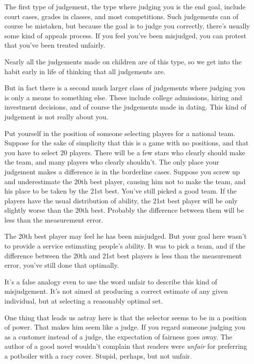 \documentclass[12pt]{book}
\begin{document}
The first type of judgement, the type where judging you is the end goal,
include court cases, grades in classes, and most competitions. Such
judgements can of course be mistaken, but because the goal is to judge
you correctly, there's usually some kind of appeals process. If you feel
you've been misjudged, you can protest that you've been treated
unfairly.

Nearly all the judgements made on children are of this type, so we get
into the habit early in life of thinking that all judgements are.

But in fact there is a second much larger class of judgements where
judging you is only a means to something else. These include college
admissions, hiring and investment decisions, and of course the
judgements made in dating. This kind of judgement is not really about
you.

Put yourself in the position of someone selecting players for a national
team. Suppose for the sake of simplicity that this is a game with no
positions, and that you have to select 20 players. There will be a few
stars who clearly should make the team, and many players who clearly
shouldn't. The only place your judgement makes a difference is in the
borderline cases. Suppose you screw up and underestimate the 20th best
player, causing him not to make the team, and his place to be taken by
the 21st best. You've still picked a good team. If the players have the
usual distribution of ability, the 21st best player will be only
slightly worse than the 20th best. Probably the difference between them
will be less than the measurement error.

The 20th best player may feel he has been misjudged. But your goal here
wasn't to provide a service estimating people's ability. It was to pick
a team, and if the difference between the 20th and 21st best players is
less than the measurement error, you've still done that optimally.

It's a false analogy even to use the word unfair to describe this kind
of misjudgement. It's not aimed at producing a correct estimate of any
given individual, but at selecting a reasonably optimal set.

One thing that leads us astray here is that the selector seems to be in
a position of power. That makes him seem like a judge. If you regard
someone judging you as a customer instead of a judge, the expectation of
fairness goes away. The author of a good novel wouldn't complain that
readers were \emph{unfair} for preferring a potboiler with a racy cover.
Stupid, perhaps, but not unfair.
\end{document}
